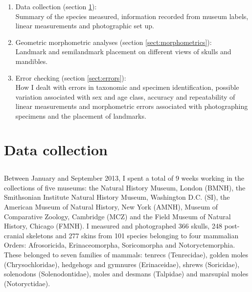 	\begin{enumerate}[i]
	
	\item Data collection (section \ref{sect:datacollection}): \\
	Summary of the species measured, information recorded from museum labels, linear measurements and photographic set up.
	
	\item Geometric morphometric analyses (section \ref{sect:morphometrics}):\\
	Landmark and semilandmark placement on different views of skulls and mandibles.
	
	\item Error checking (section \ref{sect:errors}): \\
	How I dealt with errors in taxonomic and specimen identification, possible variation associated with sex and age class, accuracy and repeatability of linear measurements and morphometric errors associated with photographing specimens and the placement of landmarks.
	
	
	\end{enumerate} 


\section{Data collection}
\label{sect:datacollection}


\subsection{}

	Between January and September 2013, I spent a total of 9 weeks working in the collections of five museums: the Natural History Museum, London (BMNH), the Smithsonian Institute Natural History Museum, Washington D.C. (SI), the American Museum of Natural History, New York (AMNH), Museum of Comparative Zoology, Cambridge (MCZ) and the Field Museum of Natural History, Chicago (FMNH). I measured and photographed 366 skulls, 248 post-cranial skeletons and 277 skins from 101 species belonging to four mammalian Orders: Afrosoricida, Erinaceomorpha, Soricomorpha and Notoryctemorphia. These belonged to seven families of mammals: tenrecs (Tenrecidae), golden moles (Chrysochloridae), hedgehogs and gymnures (Erinaceidae), shrews (Soricidae), solenodons (Solenodontidae), moles and desmans (Talpidae) and marsupial moles (Notoryctidae).

